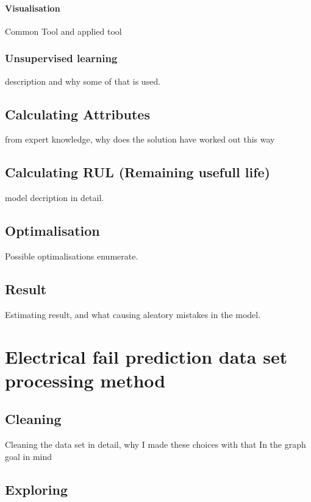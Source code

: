 		\paragraph{Visualisation}
		Common Tool and applied tool
	\subsubsection{Unsupervised learning}
	description and why some of that is used.
\subsection{Calculating Attributes}
	from expert knowledge, why does the solution have worked out this way
\subsection{Calculating RUL (Remaining usefull life)}
	model decription in detail.
\subsection{Optimalisation}
Possible optimalisations enumerate.
\subsection{Result}
Estimating result, and what causing aleatory mistakes in the model. 
\section{Electrical fail prediction data set processing method}
	\subsection{Cleaning}
Cleaning the data set in detail, why I made these choices with that In the graph goal in mind
	\subsection{Exploring}
